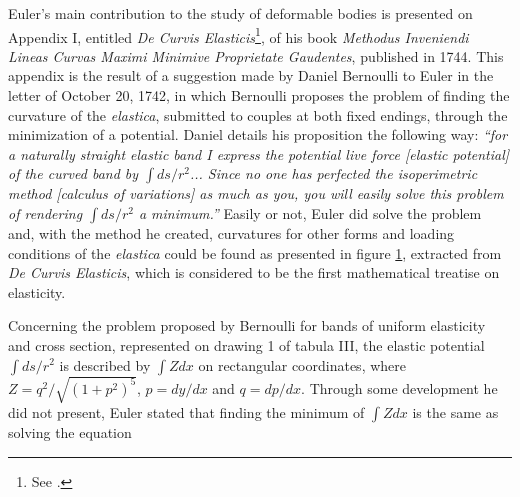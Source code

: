 Euler's main contribution to the study of deformable bodies is presented on Appendix I, entitled \emph{De Curvis Elasticis}\footnote{See \cite{oldfather_1933_1}.}, of his book \emph{Methodus Inveniendi Lineas Curvas Maximi Minimive Proprietate Gaudentes}, published in 1744. This appendix is the result of a suggestion made by Daniel Bernoulli to Euler in the letter of October 20, 1742, in which Bernoulli proposes the problem of finding the curvature of the \emph{elastica}, submitted to couples at both fixed endings, through the minimization of a potential. Daniel details his proposition the following way: \emph{``for a naturally straight elastic band I express the potential live force [elastic potential] of the curved band by $\int ds/{r^2}$... Since no one has perfected the isoperimetric method [calculus of variations] as much as you, you will easily solve this problem of rendering $\int ds/{r^2}$ a minimum.''} Easily or not, Euler did solve the problem and, with the method he created, curvatures for other forms and loading conditions of the \emph{elastica} could be found as presented in figure \ref{fg:euler}, extracted from \emph{De Curvis Elasticis}, which is considered to be the first mathematical treatise on elasticity.  
\begin{figure}[!ht]
	\centering
	\begin{center}
	\end{center}
	\label{fg:euler}
\end{figure}     
Concerning the problem proposed by Bernoulli for bands of uniform elasticity and cross section, represented on drawing 1 of tabula III, the elastic potential $\int ds/{r^2}$ is described by $\int Zdx$ on rectangular coordinates, where $Z={q^2}/{\sqrt{(1+p^2)^5}}$, $p=dy/dx$ and $q=dp/dx$. Through some development he did not present, Euler stated that finding the minimum of $\int Zdx$ is the same as solving the equation
